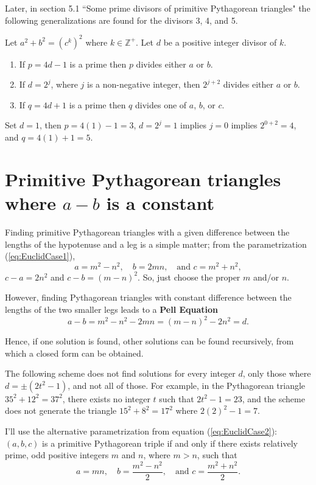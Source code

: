 \documentclass{article}
\theoremstyle{definition}
\begin{document}
Later, in section 5.1 ``Some prime divisors of primitive Pythagorean triangles" the following generalizations are found for the divisors 3, 4, and 5.

Let \(a^2 + b^2 = (c^k)^2\) where \(k \in \mathbb{Z}^+\). Let \(d\) be a positive integer divisor of \(k\).

\begin{enumerate}
\item If \(p=4d-1\) is a prime then \(p\) divides either \(a\) or \(b\).
\item If \(d=2^j\), where \(j\) is a non-negative integer, then  \(2^{j+2}\) divides either \(a\) or \(b\).
\item If \(q=4d+1\) is a prime then \(q\) divides one of \(a\), \(b\), or \(c\).
\end{enumerate}

Set \(d=1\), then \(p=4(1)-1=3\), \(d=2^j=1\) implies \(j=0\) implies \(2^{0+2}=4\), and \(q=4(1)+1=5\).

\section{Primitive Pythagorean triangles where \(a - b\) is a constant}

Finding primitive Pythagorean triangles with a given difference between the lengths of the hypotenuse and a leg is a simple matter; from the parametrization (\ref{eq:EuclidCase1}), \[ a = m^2 - n^2, \quad b = 2mn, \quad\text{and } c = m^2 + n^2, \] \(c-a=2n^2\) and \(c-b=(m-n)^2\). So, just choose the proper \(m\) and/or \(n\).

However, finding Pythagorean triangles with constant difference between the lengths of the two smaller legs leads to a \textbf{Pell Equation} \[ a-b = m^2-n^2-2mn = (m-n)^2-2n^2 = d. \]

Hence, if one solution is found, other solutions can be found recursively, from which a closed form can be obtained.

The following scheme does not find solutions for every integer \(d\), only those where \(d=\pm (2t^2-1)\), and not all of those. For example, in the Pythagorean triangle  \(35^2+12^2 = 37^2\), there exists no integer \(t\) such that \(2t^2-1=23\), and the scheme does not generate the triangle \(15^2+8^2 = 17^2\) where \(2 (2)^2-1=7\).

I'll use the alternative parametrization from equation (\ref{eq:EuclidCase2}): \((a,b,c)\) is a primitive Pythagorean triple if and only if there exists relatively prime, odd positive integers \(m\) and \(n\), where \(m > n\), such that \[ a = mn, \quad b = \frac{m^2-n^2}{2},\quad\text{and } c = \frac{m^2+n^2}{2}.\]
\end{document}
